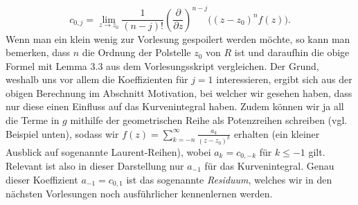 \documentclass{article}
\theoremstyle{plain}
\theoremstyle{definition}
\begin{document}
\begin{enumerate}
	      \[
		      \boxed{
			      c_{0, j} = \lim_{z \to z_0} \frac{1}{(n - j)!} \left(\frac{\partial}{\partial z}\right)^{n - j} \big( (z - z_0)^{n} f(z) \big).
		      }
	      \]
	      Wenn man ein klein wenig zur Vorlesung gespoilert werden möchte, so kann man bemerken, dass $n$ die Ordnung der Polstelle $z_0$ von $R$ ist und daraufhin die obige Formel mit Lemma 3.3 aus dem Vorlesungsskript vergleichen.
	      Der Grund, weshalb uns vor allem die Koeffizienten für $j = 1$ interessieren, ergibt sich aus der obigen Berechnung im Abschnitt \glqq Motivation\grqq{}, bei welcher wir gesehen haben, dass nur diese einen Einfluss auf das Kurvenintegral haben.
	      Zudem können wir ja all die Terme in $g$ mithilfe der geometrischen Reihe als Potenzreihen schreiben (vgl. Beispiel unten), sodass wir $f(z) = \sum_{k = -n}^{\infty} \frac{a_k}{(z - z_0)^k}$ erhalten (ein kleiner Ausblick auf sogenannte Laurent-Reihen), wobei $a_k = c_{0, -k}$ für $k \le -1$ gilt.
	      Relevant ist also in dieser Darstellung nur $a_{-1}$ für das Kurvenintegral.
	      Genau dieser Koeffizient $a_{-1} = c_{0, 1}$ ist das sogenannte \emph{Residuum}, welches wir in den nächsten Vorlesungen noch ausführlicher kennenlernen werden.
\end{enumerate}
\end{document}
